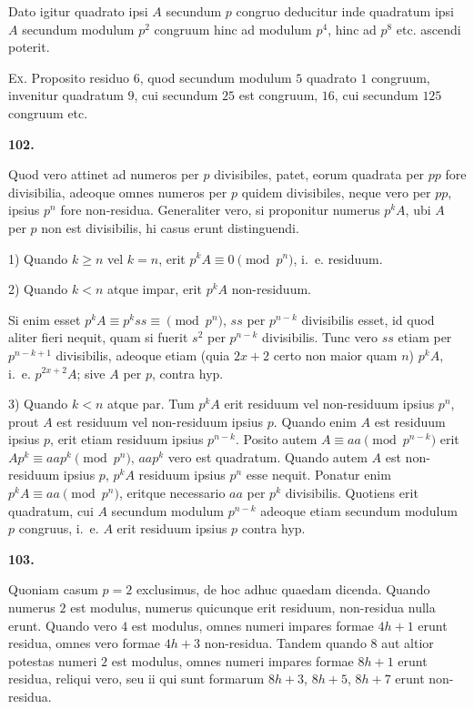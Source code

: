 \documentclass[12pt,a4paper]{article}
\theoremstyle{plain}
\theoremstyle{definition}
\theoremstyle{remark}
\begin{document}
Dato igitur quadrato ipsi $A$ secundum $p$ congruo deducitur inde quadratum ipsi $A$ secundum modulum $p^2$ congruum hinc ad modulum $p^4$, hinc ad $p^8$ etc. ascendi poterit.

\textsc{Ex.} Proposito residuo $6$, quod secundum modulum $5$ quadrato $1$ congruum, invenitur quadratum $9$, cui secundum $25$ est congruum, $16$, cui secundum $125$ congruum etc.

\setcounter{satz}{102}
\addtocounter{satz}{-1}
\textbf{102.}

Quod vero attinet ad numeros per $p$ divisibiles, patet, eorum quadrata per $pp$ fore divisibilia, adeoque omnes numeros per $p$ quidem divisibiles, neque vero per $pp$, ipsius $p^n$ fore non-residua. Generaliter vero, si proponitur numerus $p^k A$, ubi $A$ per $p$ non est divisibilis, hi casus erunt distinguendi.

1) Quando $k \geq n$ vel $k=n$, erit $p^k A \equiv 0 \pmod{p^n}$, i.~e. residuum.

2) Quando $k<n$ atque impar, erit $p^k A$ non-residuum.

Si enim esset $p^k A \equiv p^k ss \equiv \pmod{p^n}$, $ss$ per $p^{n-k}$ divisibilis esset, id quod aliter fieri nequit, quam si fuerit $s^2$ per $p^{n-k}$ divisibilis. Tunc vero $ss$ etiam per $p^{n-k+1}$ divisibilis, adeoque etiam (quia $2x+2$ certo non maior quam $n$) $p^k A$, i.~e. $p^{2x+2}A$; sive $A$ per $p$, contra hyp.

3) Quando $k<n$ atque par. Tum $p^k A$ erit residuum vel non-residuum ipsius $p^n$, prout $A$ est residuum vel non-residuum ipsius $p$. Quando enim $A$ est residuum ipsius $p$, erit etiam residuum ipsius $p^{n-k}$. Posito autem $A \equiv aa \pmod{p^{n-k}}$ erit $Ap^k \equiv aap^k \pmod{p^n}$, $aap^k$ vero est quadratum. Quando autem $A$ est non-residuum ipsius $p$, $p^k A$ residuum ipsius $p^n$ esse nequit. Ponatur enim $p^k A \equiv aa \pmod{p^n}$, eritque necessario $aa$ per $p^k$ divisibilis. Quotiens erit quadratum, cui $A$ secundum modulum $p^{n-k}$ adeoque etiam secundum modulum $p$ congruus, i.~e. $A$ erit residuum ipsius $p$ contra hyp.

\setcounter{satz}{103}
\addtocounter{satz}{-1}
\textbf{103.}

Quoniam casum $p=2$ exclusimus, de hoc adhuc quaedam dicenda. Quando numerus $2$ est modulus, numerus quicunque erit residuum, non-residua nulla erunt. Quando vero $4$ est modulus, omnes numeri impares formae $4h+1$ erunt residua, omnes vero formae $4h+3$ non-residua. Tandem quando $8$ aut altior potestas numeri $2$ est modulus, omnes numeri impares formae $8h+1$ erunt residua, reliqui vero, seu ii qui sunt formarum $8h+3$, $8h+5$, $8h+7$ erunt non-residua.
\end{document}
